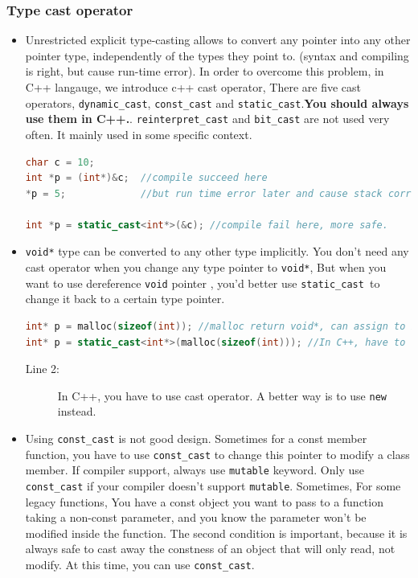\documentclass[a4paper,11pt,twoside]{book}
\begin{document}
\subsubsection{Type cast operator}
\begin{itemize}
	\item Unrestricted explicit type-casting allows to convert any pointer into any other pointer type, independently of the types they point to.  (syntax and compiling is right, but cause run-time error). In order to overcome this problem,  in C++ langauge, we introduce c++ cast operator, There are five cast operators, \texttt{dynamic\_cast}, \texttt{const\_cast} and \texttt{static\_cast}.\textbf{You should always use them in C++.}. \texttt{reinterpret\_cast} and \texttt{bit\_cast} are not used very often. It mainly used in some specific context.
\begin{lstlisting}[frame=single, language=c++]
char c = 10;    
int *p = (int*)&c;  //compile succeed here
*p = 5;             //but run time error later and cause stack corruption.
	
int *p = static_cast<int*>(&c); //compile fail here, more safe. 
\end{lstlisting}
		
	\item \texttt{void*} type can be converted to any other type implicitly. You don't need any cast operator when you change any type pointer to \texttt{void*}, But when you want to use dereference \texttt{void} pointer , you'd better use \texttt{static\_cast }to change it back to a certain type pointer.
\begin{lstlisting}[frame=single, language=c++]
int* p = malloc(sizeof(int)); //malloc return void*, can assign to int* in C
int* p = static_cast<int*>(malloc(sizeof(int))); //In C++, have to use cast
\end{lstlisting}		
		\begin{description}
			\item[Line 2:] In C++, you have to use cast operator. A better way is to use \texttt{new} instead.
		\end{description}

	\item Using \texttt{const\_cast} is not good design. Sometimes for a const member function, you have to use \texttt{const\_cast} to change this pointer to modify a class member. If compiler support, always use \texttt{mutable}  keyword.  Only use \texttt{const\_cast} if your compiler doesn't support \texttt{mutable}. Sometimes, For some legacy functions, You have a const object you want to pass to a function taking a non-const parameter, and you know the parameter won't be modified inside the function. The second condition is important, because it is always safe to cast away the constness of an object that will only read, not modify. At this time, you can use \texttt{const\_cast}.


\end{itemize}
\end{document}
